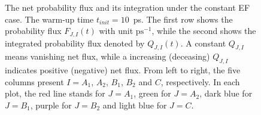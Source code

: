 \documentclass[a4paper,preprint,unsortedaddress,onecolumn]{revtex4-1}
\begin{document}
\begin{figure}
  \caption{
    The net probability flux and its integration under the constant EF case.
    The warm-up time $t_{init} = 10$~ps.
    The first row shows the probability flux $F_{J,I}(t)$ with unit $\textrm{ps}^{-1}$, while the second
    shows the integrated  probability flux denoted by $Q_{J,I}(t)$.
    A constant $Q_{J,I}$ means vanishing net flux, while a increasing (deceasing)
    $Q_{J,I}$ indicates positive (negative) net flux.
    From left to right, the five
    columns present $I = A_1$, $A_2$, $B_1$, $B_2$ and
    $C$, respectively. In each plot, the red line stands for $J=A_1$,
    green for $J=A_2$, dark blue for $J=B_1$, purple for $J=B_2$ and light blue
    for $J=C$. 
    }
  \label{fig:tmp6}
\end{figure}

\end{document}
